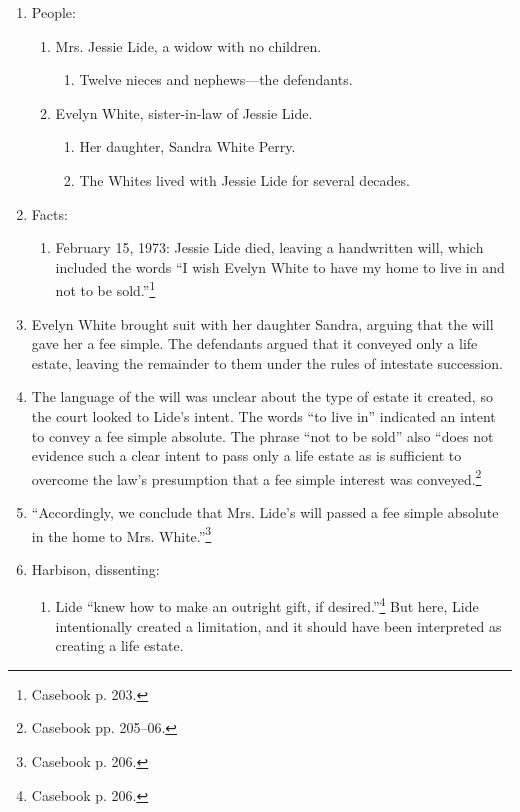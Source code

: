 \begin{enumerate}
    \item People:
    \begin{enumerate}
        \item Mrs. Jessie Lide, a widow with no children.
        \begin{enumerate}
            \item Twelve nieces and nephews---the defendants.
        \end{enumerate}
        \item Evelyn White, sister-in-law of Jessie Lide.
        \begin{enumerate}
            \item Her daughter, Sandra White Perry.
            \item The Whites lived with Jessie Lide for several decades.
        \end{enumerate}
    \end{enumerate}
    \item Facts:
    \begin{enumerate}
        \item February 15, 1973: Jessie Lide died, leaving a handwritten will, 
        which included the words ``I wish Evelyn White to have my home to live 
        in and not to be sold.''\footnote{Casebook p. 203.}
    \end{enumerate}
    \item Evelyn White brought suit with her daughter Sandra, arguing that the 
    will gave her a fee simple. The defendants argued that it conveyed only a 
    life estate, leaving the remainder to them under the rules of intestate 
    succession.
    \item The language of the will was unclear about the type of estate it 
    created, so the court looked to Lide's intent. The words ``to live in'' 
    indicated an intent to convey a fee simple absolute. The phrase ``not to 
    be sold'' also ``does not evidence such a clear intent to pass only a life 
    estate as is sufficient to overcome the law's presumption that a fee 
    simple interest was conveyed.\footnote{Casebook pp. 205--06.}
    \item ``Accordingly, we conclude that Mrs. Lide's will passed a fee 
    simple absolute in the home to Mrs. White.''\footnote{Casebook p. 206.}
    \item Harbison, dissenting:
    \begin{enumerate}
        \item Lide ``knew how to make an outright gift, if 
        desired.''\footnote{Casebook p. 206.} But here, Lide intentionally 
        created a limitation, and it should have been interpreted as creating 
        a life estate.
    \end{enumerate}
\end{enumerate}

